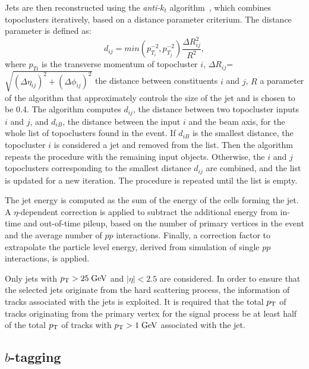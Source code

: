 Jets are then reconstructed using the {\it anti-$k_t$}
algorithm~\cite{antiktalgo}, which combines topoclusters iteratively,
based on a distance parameter criterium. The distance parameter is
defined as:
\begin{equation}
d_{ij}=min(p_{T_i}^{-2},p_{T_j}^{-2})\frac{\Delta R_{ij}^{2}}{R^{2}},
\end{equation}
where $p_{Ti}$ is the transverse momentum of topocluster $i$, 
$\Delta R_{ij}$=$\sqrt{(\Delta\eta_{ij})^{2}+(\Delta\phi_{ij})^{2}}$ the distance 
between constituents $i$ and
$j$, $R$ a parameter of the algorithm that approximately controls the size
of the jet and is chosen to be 0.4.
The algorithm computes $d_{ij}$, the distance between two topocluster
inputs $i$ and $j$, and $d_{iB}$,  the distance between the input $i$
and the beam axis, for the whole list of topoclusters found in the
event. If $d_{iB}$ is the smallest distance, the
topocluster $i$ is considered a jet and removed from the list. Then the
algorithm repeats the procedure with the remaining input objects.
Otherwise, the $i$ and $j$ topoclusters corresponding to the smallest
distance $d_{ij}$ are combined, and the list is updated for a new
iteration.
The procedure is repeated until the list is empty.

The jet energy is computed as the sum of the energy of the cells
forming the jet.
A \mbox{$\eta$-dependent} correction is applied to subtract the additional
energy from in-time and out-of-time pileup, based on the number of
primary vertices in the event and the average number of $pp$
interactions.
Finally, a correction factor to extrapolate the particle level energy,
derived from simulation of single $pp$ interactions, is applied.

Only jets with $p_{\mathrm{T}}{}>25 \; \mathrm{GeV}{}$ and $|\eta|<2.5$ are considered. In
order to ensure that the selected jets originate from the hard
scattering process, the information of tracks associated with the jets
is exploited.
It is required that the total $p_{\mathrm{T}}{}$ of tracks originating from the
primary vertex for the signal process be at least half of the total
$p_{\mathrm{T}}$ of tracks with $p_{\mathrm{T}}{}>1\; \mathrm{GeV}{}$ associated with the jet.

\subsection{$b$-tagging}
\label{sec:btag}

